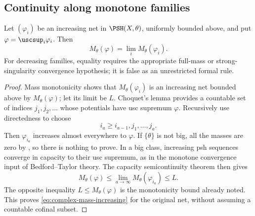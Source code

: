 \subsection{Continuity along monotone families}
\label{sec:ch51-mass-continuity}

\begin{proposition}\label{prop:complex-mass-continuity}
Let $(\varphi_i)$ be an increasing net in $\PSH(X,\theta)$, uniformly
bounded above, and put
$\varphi=\uscsup_i\varphi_i$.  Then
\[
                   M_\theta(\varphi)=\lim_iM_\theta(\varphi_i).
\tag{51.19}\label{eq:complex-mass-increasing}
\]
For decreasing families, equality requires the appropriate
full-mass or strong-singularity convergence hypothesis; it is false as
an unrestricted formal rule.
\end{proposition}

\begin{proof}
Mass monotonicity shows that $M_\theta(\varphi_i)$ is an increasing
net bounded above by $M_\theta(\varphi)$; let its limit be $L$.
Choquet's lemma provides a countable set of indices $j_1,j_2,\ldots$
whose potentials have usc supremum $\varphi$.  Recursively use
directedness to choose
\[
 i_a\geq i_{a-1},j_1,\ldots,j_a .
\]
Then $\varphi_{i_a}$ increases almost everywhere to $\varphi$.
If $\{\theta\}$ is not big, all the masses are zero by
, so there is nothing to prove.
In a big class, increasing psh sequences converge in capacity to their
usc supremum, as in the monotone convergence input of Bedford--Taylor
theory.  The capacity semicontinuity theorem
\cite[Theorem~2.3]{DDNL18mono} then gives
\[
 M_\theta(\varphi)
 \leq\lim_{a\to\infty}M_\theta(\varphi_{i_a})
 \leq L.
\]
The opposite inequality $L\leq M_\theta(\varphi)$ is the monotonicity
bound already noted.  This proves \eqref{eq:complex-mass-increasing}
for the original net, without assuming a countable cofinal subset.
\end{proof}

